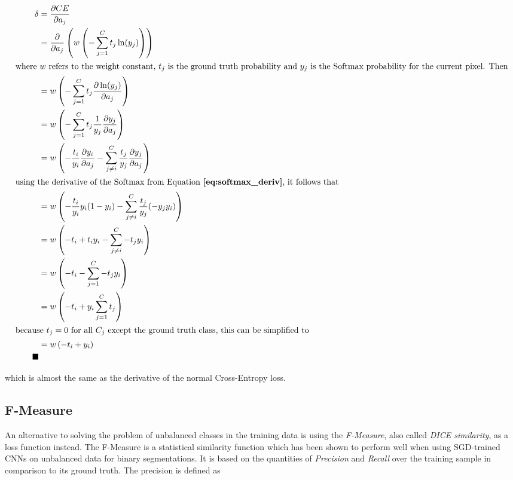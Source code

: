 \begin {align}
	\delta &= \frac{\partial CE}{\partial a_j} \\
		&= \frac{\partial}{\partial a_j} \left ( w \left ( - \sum \limits_{j=1}^{C} t_j \ln(y_j) \right ) \right ) \\ \intertext{where $w$ refers to the weight constant, $t_j$ is the ground truth probability and $y_j$ is the Softmax probability for the current pixel. Then}
		&= w \left ( - \sum \limits_{j=1}^{C} t_j \frac{\partial \ln(y_j)}{\partial a_j} \right ) \\
		&= w \left (- \sum \limits_{j=1}^{C} t_j \frac{1}{y_j} \frac{\partial y_j}{\partial a_j} \right ) \\
		&= w \left ( - \frac{t_i}{y_i} \frac{\partial y_i}{\partial a_j} - \sum \limits_{j \neq i}^{C} \frac{t_j}{y_j} \frac{\partial y_j}{\partial a_j} \right ) \\ \intertext{using the derivative of the Softmax from Equation \textbf{\ref{eq:softmax_deriv}}, it follows that}
		&= w \left ( - \frac{t_i}{y_i} y_i (1 - y_i) - \sum \limits_{j \neq i}^{C} \frac{t_j}{y_j} (- y_j y_i) \right ) \\
		&= w \left ( - t_i + t_i y_i - \sum \limits_{j \neq i}^{C} - t_j y_i \right ) \\
		&= w \left ( - t_i - \sum \limits_{j=1}^{C} - t_j y_i  \right ) \\
		&= w \left ( - t_i + y_i \sum \limits_{j=1}^{C} t_j \right ) \\ \intertext{because $t_j = 0$ for all $C_j$ except the ground truth class, this can be simplified to} 
		&= w \left (- t_i + y_i \right ) \\ \tag*{$\blacksquare$} 
\end {align}

\noindent which is almost the same as the derivative of the normal Cross-Entropy loss.


		\subsection{F-Measure}
\label{subsec:fmeasure}

An alternative to solving the problem of unbalanced classes in the training data is using the \textit{F-Measure}, also called \textit{DICE similarity}, as a loss function instead. The F-Measure is a statistical similarity function which has been shown to perform well when using SGD-trained CNNs on unbalanced data for binary segmentations. \cite{fmeasure3, fmeasure4, fmeasure5} It is based on the quantities of \textit{Precision} and \textit{Recall} over the training sample in comparison to its ground truth. The precision is defined as

